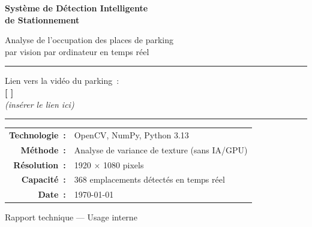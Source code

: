 \documentclass[12pt,a4paper]{report}
\begin{document}
\begin{titlepage}
  \centering
  \vspace*{1cm}

  {\Huge\bfseries\color{myblue}
    Système de Détection Intelligente\\[0.3em]
    de Stationnement\par}

  \vspace{0.6cm}
  {\large\color{gray} Analyse de l'occupation des places de parking\\
  par vision par ordinateur en temps réel\par}

  \vspace{1.5cm}
  \rule{0.8\linewidth}{1.5pt}
  \vspace{1.5cm}

  \begin{tcolorbox}[
    colback=lightblue,
    colframe=myblue,
    title={\bfseries Vidéo de Démonstration},
    fonttitle=\large,
    width=0.75\linewidth,
    center,
    boxrule=1pt,
    arc=4pt
  ]
    \centering
    \vspace{0.4cm}
    {\large Lien vers la vidéo du parking~:}\\[0.6em]
    \textbf{\large\color{myred}[ \hspace{6cm} ]}\\[0.3em]
    {\small\color{gray}\itshape (insérer le lien ici)}
    \vspace{0.4cm}
  \end{tcolorbox}

  \vspace{1.5cm}
  \rule{0.8\linewidth}{1.5pt}

  \vspace{1.5cm}
  {\large
    \begin{tabular}{rl}
      \textbf{Technologie~:}  & OpenCV, NumPy, Python 3.13 \\[4pt]
      \textbf{Méthode~:}      & Analyse de variance de texture (sans IA/GPU) \\[4pt]
      \textbf{Résolution~:}   & 1920 $\times$ 1080 pixels \\[4pt]
      \textbf{Capacité~:}     & 368 emplacements détectés en temps réel \\[4pt]
      \textbf{Date~:}         & \today \\
    \end{tabular}
  }

  \vfill
  {\small\color{gray} Rapport technique — Usage interne}
\end{titlepage}
\end{document}
